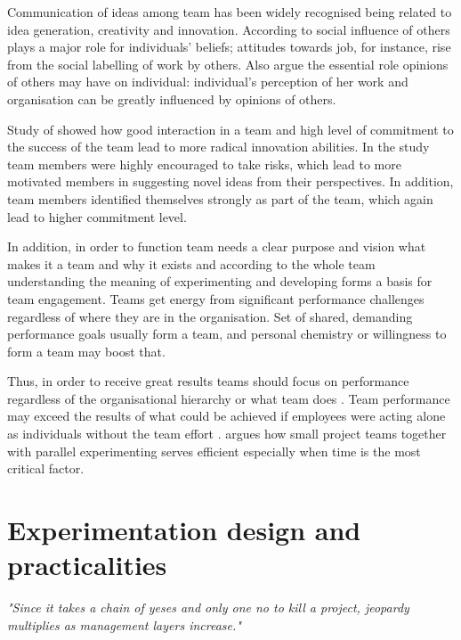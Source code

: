 Communication of ideas among team has been widely recognised being related to idea generation, creativity and innovation\citep{robinson1997corporate,mumford2002social,monge1992communication,amabile1996assessing}. According to \citet{staw1989tradeoff} social influence of others plays a major role for individuals' beliefs; attitudes towards job, for instance, rise from the social labelling of work by others.  Also \citet{salancik1978social} argue the essential role opinions of others may have on individual: individual's perception of her work and organisation can be greatly influenced by opinions of others. 

Study of \citet{sethi2001cross} showed how good interaction in a team and high level of commitment to the success of the team lead to more radical innovation abilities. In the study team members were highly encouraged to take risks, which lead to more motivated members in suggesting novel ideas from their perspectives. In addition, team members identified themselves strongly as part of the team, which again lead to higher commitment level. \citep{sethi2001cross}

In addition, in order to function team needs a clear purpose and vision what makes it a team and why it exists \citep{katzenbach1993wisdom} and according to \citet{thomke2001enlightened} the whole team understanding the meaning of experimenting and developing forms a basis for team engagement. Teams get energy from significant performance challenges regardless of where they are in the organisation. Set of shared, demanding performance goals usually form a team, and personal chemistry or willingness to form a team may boost that.  \citep{katzenbach1993wisdom}

Thus, in order to receive great results teams should focus on performance regardless of the organisational hierarchy or what team does \citep{katzenbach1993wisdom}. Team performance may exceed the results of what could be achieved if employees were acting alone as individuals without the team effort \citep{katzenbach1993wisdom}. \citet{thomke2001enlightened} argues how small project teams together with parallel experimenting serves efficient especially when time is the most critical factor.

\section{Experimentation design and practicalities}
\textit{"Since it takes a chain of yeses and only one no to kill a project, jeopardy multiplies as management layers increase."} \citep{quinn1985managing}
\newline

